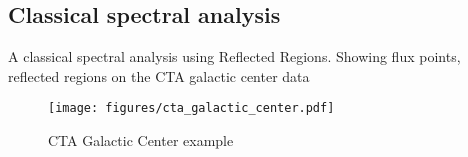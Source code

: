 \subsection{Classical spectral analysis}
\label{ssec:1D-analysis}
A classical spectral analysis using Reflected Regions. Showing flux points, reflected regions on the CTA galactic center data

\begin{figure*}[t]
	\centering
	\texttt{[image: figures/cta\_galactic\_center.pdf]}
	\caption{CTA Galactic Center example}
	\label{fig:cta_galactic_center}
\end{figure*}

